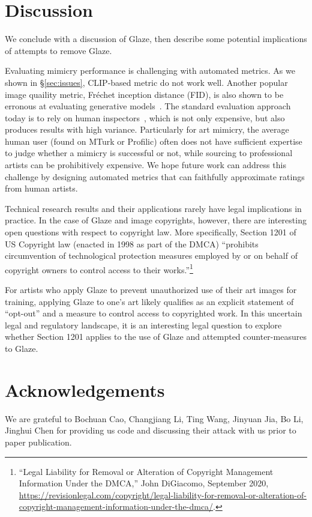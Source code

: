 \secspace
\section{Discussion}
\label{sec:discuss}

We conclude with a discussion of Glaze, then describe some potential implications of 
attempts to remove Glaze. 

 Evaluating mimicry performance is
challenging with automated metrics. As we shown in \S\ref{sec:issues}, CLIP-based metric
do not work well. Another popular image quaility metric, Fréchet inception 
distance (FID), is also shown to be erronous at evaluating generative models~\cite{podell2023sdxl}. 
The standard evaluation approach today is to rely on human inspectors~\cite{podell2023sdxl}, 
which is not only expensive, but also produces results with high
variance. Particularly for art mimicry, 
the average human user (found on MTurk or Profilic) often does not have sufficient expertise
to judge whether a mimicry is successful or not, while sourcing to professional artists
can be prohibitively expensive. We hope future work can address this challenge by
designing automated metrics that can faithfully approximate ratings from human
artists. 

 Technical research results and their applications rarely have
legal implications in practice. In the case of Glaze and image copyrights,
however, there are interesting open questions with respect to copyright
law. More specifically, Section 1201 of US Copyright law (enacted in 1998 as
part of the DMCA)  ``prohibits circumvention of technological protection
measures employed by or on behalf of copyright owners to control access to
their works.''\footnote{``Legal Liability for Removal or Alteration of Copyright Management Information Under the 
DMCA,'' John DiGiacomo, September 2020, 
\url{https://revisionlegal.com/copyright/legal-liability-for-removal-or-alteration-of-copyright-management-information-under-the-dmca/}.}

For artists who apply Glaze to prevent unauthorized use of their art
images for training, applying Glaze to one's art likely qualifies as an
explicit statement of ``opt-out'' and a measure to control access to
copyrighted work. In this uncertain legal and regulatory landscape, it is an
interesting legal question to explore whether Section 1201 applies to the use
of Glaze and attempted counter-measures to Glaze.


\section*{Acknowledgements}  
We are grateful to Bochuan Cao, Changjiang Li, Ting Wang, 
Jinyuan Jia, Bo Li, Jinghui Chen for providing us code and 
discussing their attack with us prior to paper publication.


